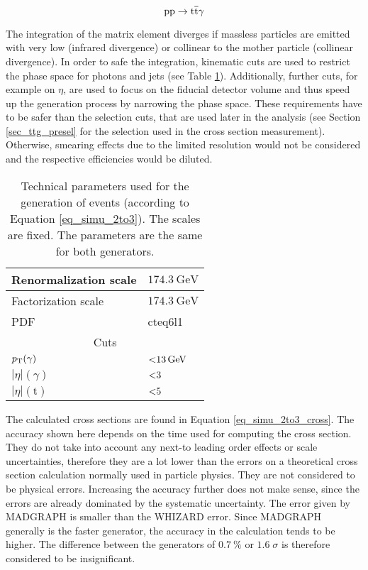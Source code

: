 \begin{equation}
\mathrm{pp} \to \mathrm{t}\overline{\mathrm{t}} \gamma
\label{eq_simu_2to3}
\end{equation}

The integration of the matrix element diverges if massless particles are emitted with very low \pt (infrared divergence) or collinear to the mother particle (collinear divergence). In order to safe the integration, kinematic cuts are used to restrict the phase space for photons and jets (see Table \ref{tab_simu_2to3}). Additionally, further cuts, for example on $\eta$, are used to focus on the fiducial detector volume and thus speed up the generation process by narrowing the phase space. These requirements have to be safer than the selection cuts, that are used later in the analysis (see Section \ref{sec_ttg_presel} for the selection used in the cross section measurement). Otherwise, smearing effects due to the limited resolution would not be considered and the respective efficiencies would be diluted. \enlargethispage{\baselineskip}\\ 

\begin{table}[ht]
\centering
    \caption{Technical parameters used for the generation of \ttgamma events (according to\\ Equation \ref{eq_simu_2to3}). The scales are fixed. The parameters are the same for both generators.}
    \begin{tabular}{| l | l |}

    \hline
    Renormalization scale & $ \SI{174.3}{\giga \electronvolt} $ \\
    \hline
    Factorization scale & $ \SI{174.3}{\giga \electronvolt} $ \\
    \hline
    PDF & cteq6l1 \cite{Pumplin:2002vw} \\
    \hline
    \multicolumn{2}{|c|}{Cuts} \\
    \hline
    $p_{\mathrm{T}}(\gamma)$ & $\SI{<13}{\giga \electronvolt}$ \\
    \hline
    $| \eta |(\gamma)$ & $\num{<3}$ \\
    \hline
    $|\eta |(\mathrm{t})$ & $\num{<5}$ \\
    \hline
    \end{tabular}
     \label{tab_simu_2to3}
\end{table}

The calculated cross sections are found in Equation \ref{eq_simu_2to3_cross}. The accuracy shown here depends on the time used for computing the cross section. They do not take into account any next-to leading order effects or scale uncertainties, therefore they are a lot lower than the errors on a theoretical cross section calculation normally used in particle physics. They are not considered to be physical errors. Increasing the accuracy further does not make sense, since the errors are already dominated by the systematic uncertainty. The error given by MADGRAPH is smaller than the WHIZARD error. Since MADGRAPH generally is the faster generator, the accuracy in the calculation tends to be higher.
The difference between the generators of $\SI{0.7 }{\percent}$ or $ 1.6\; \sigma$ is therefore considered to be insignificant.

